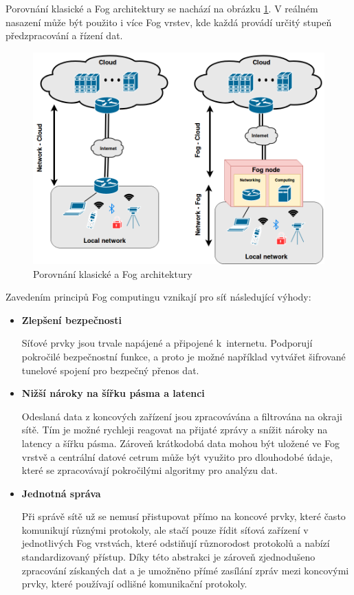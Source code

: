  Porovnání klasické a Fog architektury se nachází na obrázku \ref{obr.fog}. V reálném nasazení může
 být použito i více Fog vrstev, kde každá provádí určitý stupeň předzpracování a řízení
 dat.
\begin{figure}[ht]
\begin{center}
\includegraphics[scale=0.38]{pictures/fog}
\caption{Porovnání klasické a Fog architektury}
\label{obr.fog}
\end{center}
\end{figure}
 Zavedením principů Fog computingu vznikají pro síť následující výhody:
 \begin{itemize}
 \item \textbf{Zlepšení bezpečnosti} \cite{fog}
 
     Síťové prvky jsou trvale napájené a připojené k internetu. Podporují pokročilé
     bezpečnostní funkce, a proto je možné například vytvářet šifrované tunelové
     spojení pro bezpečný přenos dat.     
\item \textbf{Nižší nároky na šířku pásma a latenci} \cite{fog}

    Odeslaná data z koncových zařízení jsou zpracovávána a filtrována na okraji 
    sítě. Tím je možné rychleji reagovat na přijaté zprávy a snížit nároky
    na latency a šířku pásma. Zároveň krátkodobá data mohou být uložené ve 
    Fog vrstvě a centrální datové cetrum může být využito pro dlouhodobé údaje, 
    které se zpracovávají pokročilými algoritmy pro analýzu dat.
 \item \textbf{Jednotná správa} \cite{fog}
 
    Při správě sítě už se nemusí přistupovat přímo na koncové prvky, které 
    často komunikují různými protokoly, ale stačí pouze
    řídit síťová zařízení v jednotlivých Fog vrstvách, které odstiňují různorodost
    protokolů a nabízí standardizovaný přístup. Díky této abstrakci je 
    zároveň zjednodušeno zpracování získaných dat a je umožněno přímé zasílání zpráv
    mezi koncovými prvky, které používají odlišné komunikační protokoly.
 \end{itemize} 
 

